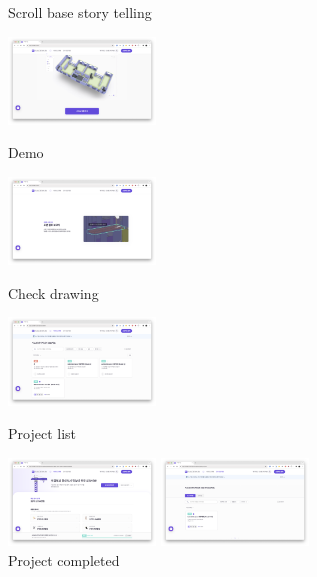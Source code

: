 \begin{itemize}[label=]
\begin{itemize}[label=]
\begin{figure}[!ht]
\begin{fullwidth}
{					            \caption*{Scroll base story telling}
				            }\qquad
				            \parbox{0.35\textwidth}{
					            \centering
					            \includegraphics[width=0.35\textwidth]{images/builderhub-customer-3.png}
					            \caption*{Demo}
				            }\qquad
				            \parbox{0.35\textwidth}{
					            \centering
					            \includegraphics[width=0.35\textwidth]{images/builderhub-customer-4.png}
					            \caption*{Check drawing}
				            }
				            \parbox{0.35\textwidth}{
					            \centering
					            \includegraphics[width=0.35\textwidth]{images/builderhub-customer-project-1.png}
					            \caption*{Project list}
				            }\qquad
				            \parbox{0.35\textwidth}{
					            \centering
					            \includegraphics[width=0.35\textwidth]{images/builderhub-customer-project-2.png}
					            \caption*{Project completed}
				            }\qquad
				            \parbox{0.35\textwidth}{
					            \centering
					            \includegraphics[width=0.35\textwidth]{images/builderhub-customer-project-3.png}
}
\end{fullwidth}
\end{figure}
\end{itemize}
\end{itemize}
